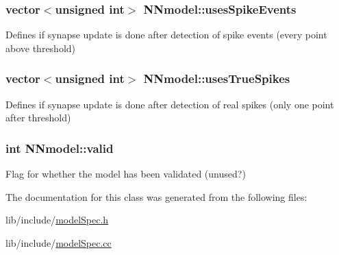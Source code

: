 \hypertarget{classNNmodel_a5d1a849b688fd0b7fdb999d39b5e049b}{
\subsubsection[{uses\+Spike\+Events}]{\setlength{\rightskip}{0pt plus 5cm}vector$<$unsigned int$>$ N\+Nmodel\+::uses\+Spike\+Events}}\label{classNNmodel_a5d1a849b688fd0b7fdb999d39b5e049b}


Defines if synapse update is done after detection of spike events (every point above threshold) 

\hypertarget{classNNmodel_a5d70d70919f892c66196fdea7cb13a45}{
\subsubsection[{uses\+True\+Spikes}]{\setlength{\rightskip}{0pt plus 5cm}vector$<$unsigned int$>$ N\+Nmodel\+::uses\+True\+Spikes}}\label{classNNmodel_a5d70d70919f892c66196fdea7cb13a45}


Defines if synapse update is done after detection of real spikes (only one point after threshold) 

\hypertarget{classNNmodel_ad09a7a4c3888876f7a95e8d5e344c71e}{
\subsubsection[{valid}]{\setlength{\rightskip}{0pt plus 5cm}int N\+Nmodel\+::valid}}\label{classNNmodel_ad09a7a4c3888876f7a95e8d5e344c71e}


Flag for whether the model has been validated (unused?) 



The documentation for this class was generated from the following files\+:\begin{DoxyCompactItemize}
\item 
lib/include/\hyperlink{modelSpec_8h}{model\+Spec.\+h}\item 
lib/include/\hyperlink{modelSpec_8cc}{model\+Spec.\+cc}\end{DoxyCompactItemize}
